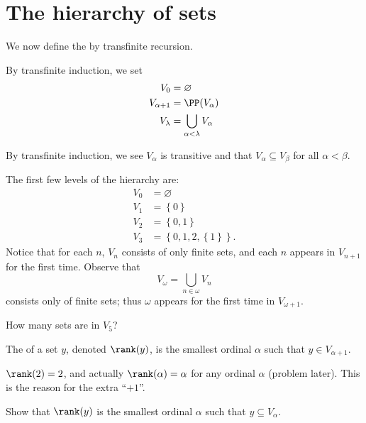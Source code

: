\section{The hierarchy of sets}
We now define the  by transfinite recursion.
\begin{definition}
	By transfinite induction, we set
	\begin{align*}
		V_0 &= \varnothing \\
		V_{\alpha + 1} &= \PP(V_\alpha) \\
		V_\lambda &= \bigcup_{\alpha<\lambda} V_\alpha
	\end{align*}
\end{definition}
By transfinite induction, we see $V_\alpha$ is transitive
and that $V_\alpha \subseteq V_\beta$ for all $\alpha < \beta$.

\begin{example}
	The first few levels of the hierarchy are:
	\begin{align*}
		V_0 &= \varnothing \\
		V_1 &= \left\{ 0 \right\} \\
		V_2 &=  \left\{ 0, 1 \right\} \\
		V_3 &= \left\{ 0, 1, 2, \left\{ 1 \right\} \right\}.
	\end{align*}
	Notice that for each $n$, $V_n$ consists of only finite sets,
	and each $n$ appears in $V_{n+1}$ for the first time.
	Observe that
	\[ V_\omega = \bigcup_{n \in \omega} V_n \]
	consists only of finite sets; thus $\omega$ appears for the first time
	in $V_{\omega+1}$.
\end{example}
\begin{ques}
	How many sets are in $V_5$?
\end{ques}

\begin{definition}
	The  of a set $y$, denoted $\rank(y)$,
	is the smallest ordinal $\alpha$ such that $y \in V_{\alpha+1}$.
\end{definition}
\begin{example}
	$\rank(2) = 2$, and actually $\rank(\alpha)=\alpha$
	for any ordinal $\alpha$ (problem later).
	This is the reason for the extra ``$+1$''.
\end{example}
\begin{ques}
	Show that $\rank(y)$ is the smallest ordinal $\alpha$
	such that $y \subseteq V_\alpha$.
\end{ques}

